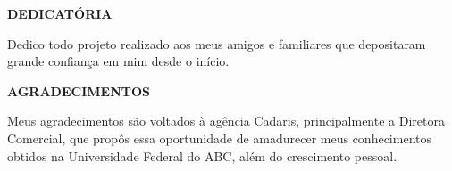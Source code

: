 \documentclass[
  12pt,				%
  openany,
  oneside,
  a4paper,			%
  english,			%
  brazil
]{article}
\numberwithin{figure}{section}
\numberwithin{table}{section}
\begin{document}

\begin{titlepage}

\begin{center}
\textbf{DEDICATÓRIA}
\end{center}

Dedico todo projeto realizado aos meus amigos e familiares que depositaram grande confiança em mim desde o início.


\end{titlepage}


\begin{titlepage}

\begin{center}
\textbf{AGRADECIMENTOS}
\end{center}

Meus agradecimentos são voltados à agência Cadaris, principalmente a Diretora Comercial, que propôs essa oportunidade de amadurecer meus conhecimentos obtidos na Universidade Federal do ABC, além do crescimento pessoal.


\end{titlepage}


%
%
%

\end{document}
